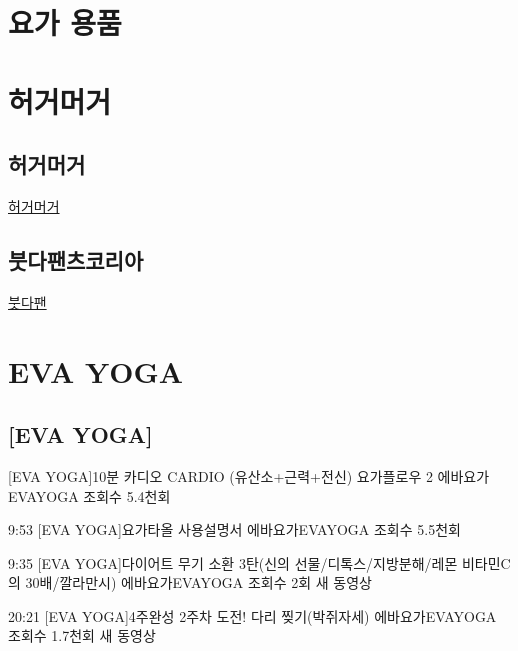 \documentclass[12pt, a4paper, oneside]{book}
\let\stdsection\section
\renewcommand\section{\newpage\stdsection}
\begin{document}
%
%
%
\newpage
\section{요가 용품}


%
%
%
\newpage
\section{허거머거}

\subsection{허거머거}



	\href{http://www.huggermugger.co.kr/}{허거머거}

\subsection{붓다팬츠코리아}

	\href{http://it-store.co.kr/main/index.php}{붓다팬}



%
%
%
\newpage
\section{EVA YOGA}


\subsection{[EVA YOGA]}


[EVA YOGA]10분 카디오 CARDIO (유산소+근력+전신) 요가플로우 2
에바요가EVAYOGA
조회수 5.4천회


9:53
[EVA YOGA]요가타올 사용설명서
에바요가EVAYOGA
조회수 5.5천회


9:35
[EVA YOGA]다이어트 무기 소환 3탄(신의 선물/디톡스/지방분해/레몬 비타민C의 30배/깔라만시)
에바요가EVAYOGA
조회수 2회
새 동영상


20:21
[EVA YOGA]4주완성 2주차 도전! 다리 찢기(박쥐자세)
에바요가EVAYOGA
조회수 1.7천회
새 동영상
\end{document}
